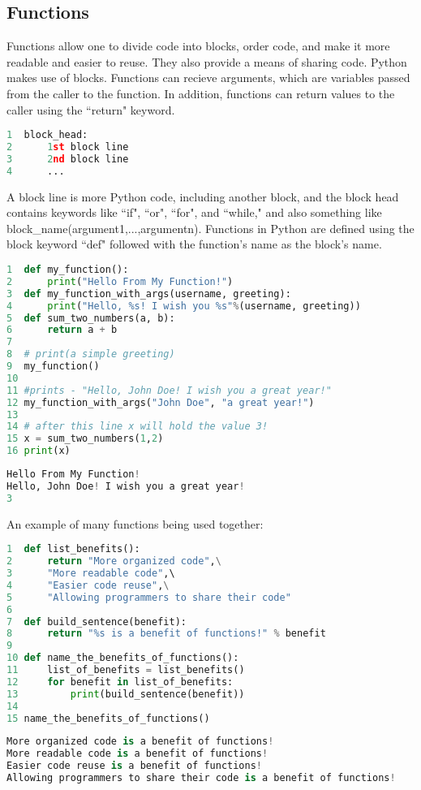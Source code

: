 \documentclass[crop=false,class=book]{standalone}
\begin{document}
\subsection{Functions}
Functions allow one to divide code into blocks, order code, and make it more readable and easier to reuse. They also provide a means of sharing code. Python makes use of blocks. Functions can recieve arguments, which are variables passed from the caller to the function. In addition, functions can return values to the caller using the ``return" keyword.
\begin{lstlisting}[language=python,frame=single,basicstyle=\footnotesize,frame=single,caption=Block Example]
1  block_head:
2      1st block line
3      2nd block line
4      ...
\end{lstlisting}
A block line is more Python code, including another block, and the block head contains keywords like ``if", ``or", ``for", and ``while," and also something like block\_name(argument1,...,argumentn). Functions in Python are defined using the block keyword ``def" followed with the function's name as the block's name. 
\begin{lstlisting}[language=python,frame=single,basicstyle=\footnotesize,frame=single,caption=input]
1  def my_function():
2      print("Hello From My Function!")
3  def my_function_with_args(username, greeting):
4      print("Hello, %s! I wish you %s"%(username, greeting))
5  def sum_two_numbers(a, b):
6      return a + b
7
8  # print(a simple greeting)
9  my_function()
10
11 #prints - "Hello, John Doe! I wish you a great year!"
12 my_function_with_args("John Doe", "a great year!")
13
14 # after this line x will hold the value 3!
15 x = sum_two_numbers(1,2)
16 print(x)
\end{lstlisting}
\begin{lstlisting}[language=python,frame=single,basicstyle=\footnotesize,frame=single,caption=output]
Hello From My Function!
Hello, John Doe! I wish you a great year!
3
\end{lstlisting}
\newpage
An example of many functions being used together:
\begin{lstlisting}[language=python,frame=single,basicstyle=\footnotesize,frame=single,caption=input]
1  def list_benefits():
2      return "More organized code",\
3      "More readable code",\ 
4      "Easier code reuse",\
5      "Allowing programmers to share their code"
6
7  def build_sentence(benefit):
8      return "%s is a benefit of functions!" % benefit
9
10 def name_the_benefits_of_functions():
11     list_of_benefits = list_benefits()
12     for benefit in list_of_benefits:
13         print(build_sentence(benefit))
14
15 name_the_benefits_of_functions()
\end{lstlisting}
\begin{lstlisting}[language=python,frame=single,basicstyle=\footnotesize,frame=single,caption=output]
More organized code is a benefit of functions!
More readable code is a benefit of functions!
Easier code reuse is a benefit of functions!
Allowing programmers to share their code is a benefit of functions!
\end{lstlisting}
\end{document}
